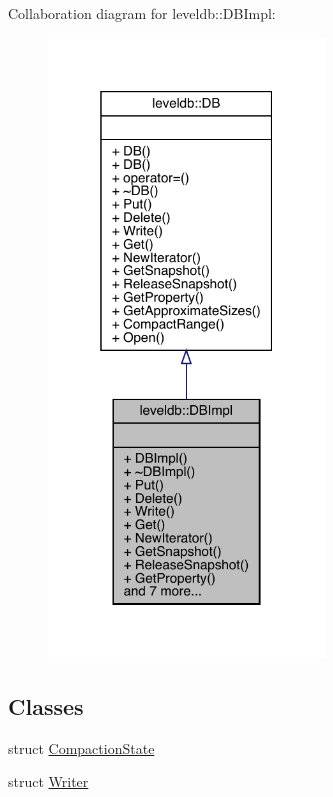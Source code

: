 Collaboration diagram for leveldb\+::D\+B\+Impl\+:
\nopagebreak
\begin{figure}[H]
\begin{center}
\leavevmode
\includegraphics[width=208pt]{classleveldb_1_1_d_b_impl__coll__graph}
\end{center}
\end{figure}
\subsection*{Classes}
\begin{DoxyCompactItemize}
\item 
struct \mbox{\hyperlink{structleveldb_1_1_d_b_impl_1_1_compaction_state}{Compaction\+State}}
\item 
struct \mbox{\hyperlink{structleveldb_1_1_d_b_impl_1_1_writer}{Writer}}
\end{DoxyCompactItemize}
